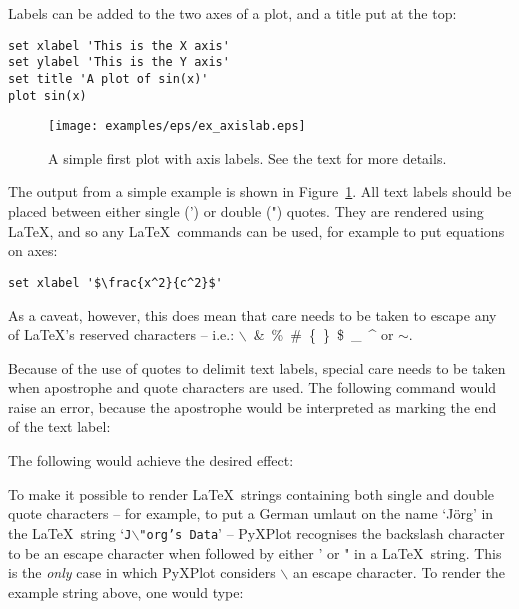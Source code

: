 Labels can be added to the two axes of a plot, and a title put at the top:

\begin{verbatim}
set xlabel 'This is the X axis'
set ylabel 'This is the Y axis'
set title 'A plot of sin(x)'
plot sin(x)
\end{verbatim}

\begin{figure}
\begin{center}
\texttt{[image: examples/eps/ex\_axislab.eps]}
\end{center}
\caption{A simple first plot with axis labels. See the text for more details.}
\label{fig:ex_axislab}
\end{figure}

\noindent The output from a simple example is shown in
Figure~\ref{fig:ex_axislab}. All text labels should be placed between either
single (') or double (") quotes. They are rendered using \LaTeX, and so any
\LaTeX\ commands can be used, for example to put equations on axes:

\begin{verbatim}
set xlabel '$\frac{x^2}{c^2}$'
\end{verbatim}

\noindent As a caveat, however, this does mean that care needs to be taken to
escape any of \LaTeX's reserved characters -- i.e.:
$\backslash$~\&~\%~\#~\{~\}~\$~\_~\^{} or $\sim$.

Because of the use of quotes to delimit text labels, special care needs to be
taken when apostrophe and quote characters are used. The following command
would raise an error, because the apostrophe would be interpreted as marking
the end of the text label:


\noindent The following would achieve the desired effect:


To make it possible to render \LaTeX\ strings containing both single and double
quote characters -- for example, to put a German umlaut on the name `J\"org' in
the \LaTeX\ string `{\tt J$\backslash$"org's Data}' -- PyXPlot recognises
the backslash character to be an escape character when followed by either ' or
" in a \LaTeX\ string. This is the \textit{only} case in which PyXPlot
considers $\backslash$ an escape character. To render the example string above,
one would type:


